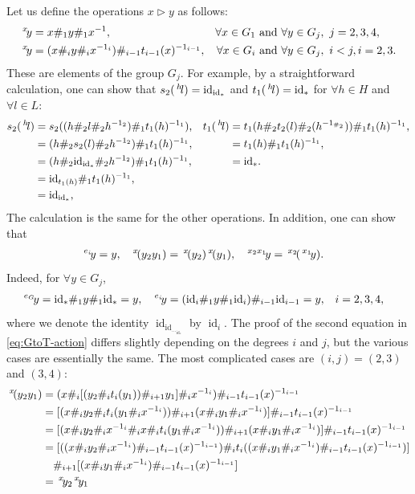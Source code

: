 \documentclass[11pt, reqno]{amsart} %
\newcommand{\act}[1]{\,\sp{#1}\!}
\newcommand{\id}{{\mathop{\mathrm{id}}}}
\theoremstyle{definition}
\theoremstyle{remark}
\numberwithin{equation}{section}
\begin{document}
Let us define the operations $x\triangleright y$ as follows:
\begin{align*}
  \act{x}y &= x\#_1y\#_1x^{-1}, & \forall x\in G_1 &\text{ and }\forall y\in G_j,~j=2,3,4, \\
  \act{x}y &= (x\#_iy\#_ix^{-1_i})\#_{i-1}t_{i-1}(x)^{-1_{i-1}}, & \forall x\in G_i &\text{ and }\forall y\in G_j,~i<j,i=2,3.
\end{align*}
These are elements of the group $G_j$. For example, by a straightforward calculation, one can show that $s_2(\act{h}l)=\id_{\id_*}$ and $t_1(\act{h}l)=\id_*$ for $\forall h\in H$ and $\forall l\in L$:
\begin{align*}
  s_2(\act{h}l) 
  &= s_2((h\#_2l\#_2h^{-1_2})\#_1t_1(h)^{-1_1}), &
  t_1(\act{h}l)
  &= t_1(h\#_2t_2(l)\#_2(h^{-1_{\#_2}}))\#_1t_1(h)^{-1_1}, \\
  &= (h\#_2s_2(l)\#_2h^{-1_2})\#_1t_1(h)^{-1_1}, &
  &= t_1(h)\#_1t_1(h)^{-1_1}, \\
  &= (h\#_2\id_{\id_*}\#_2h^{-1_2})\#_1t_1(h)^{-1_1}, &
  &= \id_*. \\
  &= \id_{t_1(h)}\#_1t_1(h)^{-1_1}, \\
  &= \id_{\id_*},
\end{align*}
The calculation is the same for the other operations. In addition, one can show that
\begin{align}
  \label{eq:GtoT-action}
  \act{e_i}y &= y, & \act{x}(y_2y_1) &= \act{x}(y_2)\act{x}(y_1), & \act{x_2x_1}y &= \act{x_2}(\act{x_1}y).
\end{align}
Indeed, for $\forall y\in G_j$,
\begin{align*}
  \act{e_G}y &= \id_*\#_1y\#_1\id_* = y, &
  \act{e_i}y &= (\id_i\#_1y\#_1\id_i)\#_{i-1}\id_{i-1} = y, & i&=2,3,4,
\end{align*}
where we denote the identity $\id_{\id_{\ldots_{\id_*}}}$ by $\id_i$. The proof of the second equation in \eqref{eq:GtoT-action} differs slightly depending on the degrees $i$ and $j$, but the various cases are essentially the same. The most complicated cases are $(i,j)=(2,3)$ and $(3,4)$: 
\begin{align*}
  \act{x}(y_2y_1) 
  &= (x\#_i[(y_2\#_it_i(y_1))\#_{i+1}y_1]\#_ix^{-1_i})\#_{i-1}t_{i-1}(x)^{-1_{i-1}} \\
  &= [(x\#_iy_2\#_it_i(y_1\#_ix^{-1_i}))\#_{i+1}(x\#_iy_1\#_ix^{-1_i})]\#_{i-1}t_{i-1}(x)^{-1_{i-1}} \\
  &= [(x\#_iy_2\#_ix^{-1_i}\#_ix\#_it_i(y_1\#_ix^{-1_i}))\#_{i+1}(x\#_iy_1\#_ix^{-1_i})]\#_{i-1}t_{i-1}(x)^{-1_{i-1}} \\
  &= 
  [
    ((x\#_iy_2\#_ix^{-1_i})\#_{i-1}t_{i-1}(x)^{-1_{i-1}})
    \#_i
    t_i((x\#_iy_1\#_ix^{-1_i})\#_{i-1}t_{i-1}(x)^{-1_{i-1}})
  ] \\
  &\hspace{1em} 
  \#_{i+1}
  [
    (x\#_iy_1\#_ix^{-1_i})\#_{i-1}t_{i-1}(x)^{-1_{i-1}}
  ] \\
  &= \act{x}y_2\act{x}y_1
\end{align*}
\end{document}
